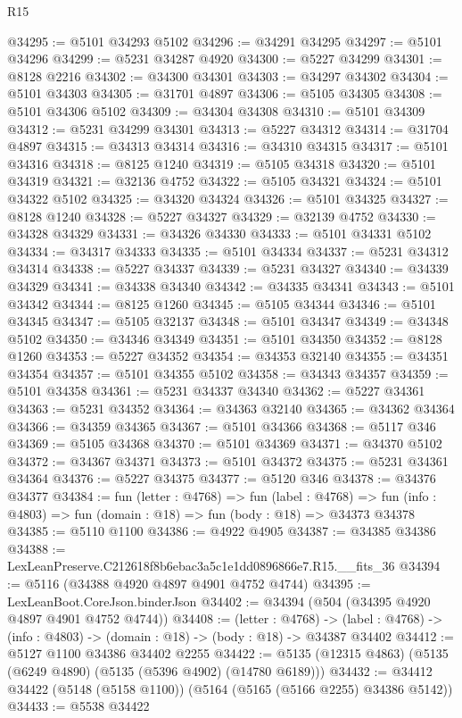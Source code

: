 \begin{lexlean}{R15}
\begin{coremodule}
{{{{{{{{{{{@34295 := @5101 @34293 @5102
@34296 := @34291 @34295
@34297 := @5101 @34296
@34299 := @5231 @34287 @4920
@34300 := @5227 @34299
@34301 := @8128 @2216
@34302 := @34300 @34301
@34303 := @34297 @34302
@34304 := @5101 @34303
@34305 := @31701 @4897
@34306 := @5105 @34305
@34308 := @5101 @34306 @5102
@34309 := @34304 @34308
@34310 := @5101 @34309
@34312 := @5231 @34299 @34301
@34313 := @5227 @34312
@34314 := @31704 @4897
@34315 := @34313 @34314
@34316 := @34310 @34315
@34317 := @5101 @34316
@34318 := @8125 @1240
@34319 := @5105 @34318
@34320 := @5101 @34319
@34321 := @32136 @4752
@34322 := @5105 @34321
@34324 := @5101 @34322 @5102
@34325 := @34320 @34324
@34326 := @5101 @34325
@34327 := @8128 @1240
@34328 := @5227 @34327
@34329 := @32139 @4752
@34330 := @34328 @34329
@34331 := @34326 @34330
@34333 := @5101 @34331 @5102
@34334 := @34317 @34333
@34335 := @5101 @34334
@34337 := @5231 @34312 @34314
@34338 := @5227 @34337
@34339 := @5231 @34327
@34340 := @34339 @34329
@34341 := @34338 @34340
@34342 := @34335 @34341
@34343 := @5101 @34342
@34344 := @8125 @1260
@34345 := @5105 @34344
@34346 := @5101 @34345
@34347 := @5105 @32137
@34348 := @5101 @34347
@34349 := @34348 @5102
@34350 := @34346 @34349
@34351 := @5101 @34350
@34352 := @8128 @1260
@34353 := @5227 @34352
@34354 := @34353 @32140
@34355 := @34351 @34354
@34357 := @5101 @34355 @5102
@34358 := @34343 @34357
@34359 := @5101 @34358
@34361 := @5231 @34337 @34340
@34362 := @5227 @34361
@34363 := @5231 @34352
@34364 := @34363 @32140
@34365 := @34362 @34364
@34366 := @34359 @34365
@34367 := @5101 @34366
@34368 := @5117 @346
@34369 := @5105 @34368
@34370 := @5101 @34369
@34371 := @34370 @5102
@34372 := @34367 @34371
@34373 := @5101 @34372
@34375 := @5231 @34361 @34364
@34376 := @5227 @34375
@34377 := @5120 @346
@34378 := @34376 @34377
@34384 := fun (letter : @4768) =>
  fun (label : @4768) =>
  fun (info : @4803) => fun (domain : @18) => fun (body : @18) => @34373 @34378
@34385 := @5110 @1100
@34386 := @4922 @4905
@34387 := @34385 @34386
@34388 := LexLeanPreserve.C212618f8b6ebac3a5c1e1dd0896866e7.R15.__fits_36
@34394 := @5116 (@34388 @4920 @4897 @4901 @4752 @4744)
@34395 := LexLeanBoot.CoreJson.binderJson
@34402 := @34394 (@504 (@34395 @4920 @4897 @4901 @4752 @4744))
@34408 := (letter : @4768) ->
  (label : @4768) -> (info : @4803) -> (domain : @18) -> (body : @18) -> @34387 @34402
@34412 := @5127 @1100 @34386 @34402 @2255
@34422 := @5135 (@12315 @4863) (@5135 (@6249 @4890) (@5135 (@5396 @4902) (@14780 @6189)))
@34432 := @34412 @34422 (@5148 (@5158 @1100)) (@5164 (@5165 (@5166 @2255) @34386 @5142))
@34433 := @5538 @34422
}}}}}}}}}}}
\end{coremodule}
\end{lexlean}
